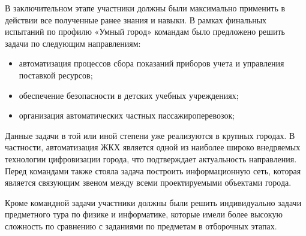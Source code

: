 В заключительном этапе участники должны были максимально применить в действии все полученные ранее знания и навыки. В рамках финальных испытаний по профилю «Умный город» командам было предложено решить задачи по следующим направлениям:
\begin{itemize}
\item автоматизация процессов сбора показаний приборов учета и управления поставкой ресурсов;
\item  обеспечение безопасности в детских учебных учреждениях;
\item  организация автоматических частных пассажироперевозок;
\end{itemize}

Данные задачи в той или иной степени уже реализуются в крупных городах. В частности, автоматизация ЖКХ является одной из наиболее широко внедряемых технологии цифровизации города, что подтверждает актуальность направления. Перед командами также стояла задача построить информационную сеть, которая является связующим звеном между всеми проектируемыми объектами города.

Кроме командной задачи участники должны были решить индивидуально задачи предметного тура по физике и информатике, которые имели более высокую сложность по сравнению с заданиями по предметам в отборочных этапах.

\clearpage
\endgroup